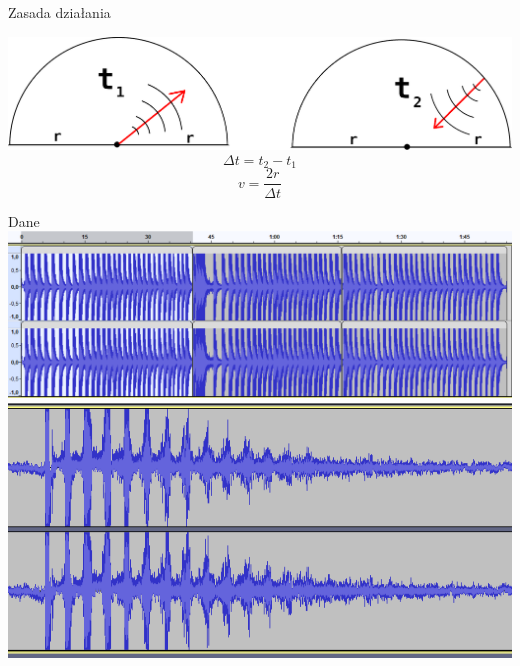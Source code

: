 \documentclass{beamer}
\begin{document}
\begin{frame}{Zasada działania}

	\includegraphics[width=\linewidth]{wave.png}
	$$\Delta t=t_2-t_1$$
	$$v=\frac{2r}{\Delta t}$$

\end{frame}

\begin{frame}{Dane}
	\centering
	\includegraphics[width=\linewidth]{Data.png}
	\includegraphics[width=0.6\linewidth]{Przechwycenie obrazu ekranu_2024-05-04_14-41-05.png}
\end{frame}
\end{document}

